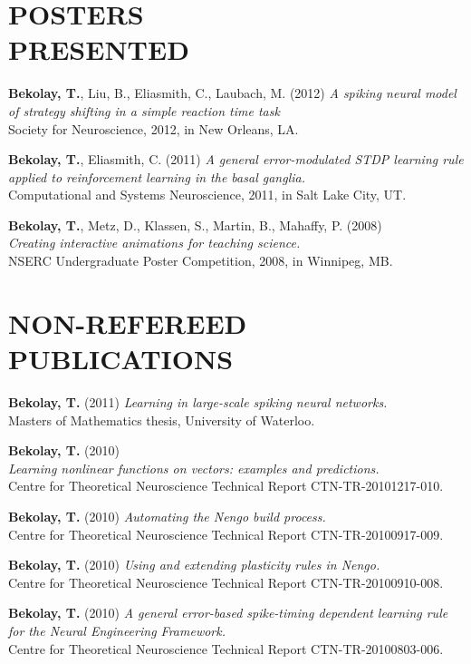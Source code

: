 \documentclass[line,margin]{res}
\begin{document}
\begin{resume}
\section{POSTERS \\PRESENTED}
  \textbf{Bekolay, T.}, Liu, B., Eliasmith, C., Laubach, M. (2012)
    {\sl A spiking neural model of strategy shifting in a simple reaction time task} \\
    Society for Neuroscience, 2012, in New Orleans, LA.

  \textbf{Bekolay, T.}, Eliasmith, C. (2011)
    {\sl A general error-modulated STDP learning rule applied to reinforcement learning in the basal ganglia.} \\
    Computational and Systems Neuroscience, 2011, in Salt Lake City, UT.
  
  \textbf{Bekolay, T.}, Metz, D., Klassen, S., Martin, B., Mahaffy, P. (2008) \\
    {\sl Creating interactive animations for teaching science.} \\
    NSERC Undergraduate Poster Competition, 2008, in Winnipeg, MB.

\section{NON-REFEREED \\PUBLICATIONS}
  \textbf{Bekolay, T.} (2011)
    {\sl Learning in large-scale spiking neural networks.} \\
    Masters of Mathematics thesis, University of Waterloo.

  \textbf{Bekolay, T.} (2010) \\
    {\sl Learning nonlinear functions on vectors: examples and predictions.} \\
      Centre for Theoretical Neuroscience Technical Report CTN-TR-20101217-010.

  \textbf{Bekolay, T.} (2010)
    {\sl Automating the Nengo build process.} \\
    Centre for Theoretical Neuroscience Technical Report CTN-TR-20100917-009.

  \textbf{Bekolay, T.} (2010)
    {\sl Using and extending plasticity rules in Nengo.} \\
    Centre for Theoretical Neuroscience Technical Report CTN-TR-20100910-008.

  \textbf{Bekolay, T.} (2010)
    {\sl A general error-based spike-timing dependent learning rule for the Neural Engineering Framework.} \\
    Centre for Theoretical Neuroscience Technical Report CTN-TR-20100803-006.


\end{resume}
\end{document}
